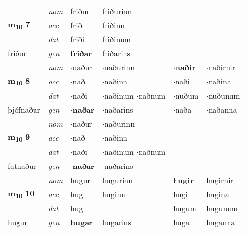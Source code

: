 \begin{longtable}[l]{llllll}
\multirow{3}{*}{{{\textbf{m{\textsubscript{10}}} \Large{\textbf{7}}}}}  & {\footnotesize{{\textit{nom}}}} & friður & friðurinn    & \textbf{} &   \\*
 &  {\footnotesize{{\textit{acc}}}} & frið  & friðinn   &   &  \\*
 &  {\footnotesize{{\textit{dat}}}} & friði & friðinum   &  &  \\*
 {\footnotesize{friður}} &   {\footnotesize{{\textit{gen}}}} & \textbf{friðar}  & friðarins  &  &  \\
\cmidrule{1-6}


\multirow{3}{*}{{{\textbf{m{\textsubscript{10}}} \Large{\textbf{8}}}}}  & {\footnotesize{{\textit{nom}}}} & $\cdot$naður & $\cdot$naðurinn    & \textbf{$\cdot$naðir} & $\cdot$naðirnir  \\*
 &  {\footnotesize{{\textit{acc}}}} & $\cdot$nað  & $\cdot$naðinn   & $\cdot$naði  & $\cdot$naðina \\*
 &  {\footnotesize{{\textit{dat}}}} & $\cdot$naði & \specialcell{$\cdot$naðinum\\  $\cdot$naðnum}   & $\cdot$nuðum & $\cdot$nuðunum \\*
 {\footnotesize{þjófnaður}} &   {\footnotesize{{\textit{gen}}}} & \textbf{$\cdot$naðar}  & $\cdot$naðarins  & $\cdot$naða & $\cdot$naðanna \\
\cmidrule{1-6}


\multirow{3}{*}{{{\textbf{m{\textsubscript{10}}} \Large{\textbf{9}}}}}  & {\footnotesize{{\textit{nom}}}} & $\cdot$naður & $\cdot$naðurinn    & \textbf{} &   \\*
 &  {\footnotesize{{\textit{acc}}}} & $\cdot$nað  & $\cdot$naðinn   &   &  \\*
 &  {\footnotesize{{\textit{dat}}}} & $\cdot$naði & \specialcell{$\cdot$naðinum\\  $\cdot$naðnum}   &  &  \\*
 {\footnotesize{fatnaður}} &   {\footnotesize{{\textit{gen}}}} & \textbf{$\cdot$naðar}  & $\cdot$naðarins  &  &  \\
\cmidrule{1-6}


\multirow{3}{*}{{{\textbf{m{\textsubscript{10}}} \Large{\textbf{10}}}}}  & {\footnotesize{{\textit{nom}}}} & hugur & hugurinn    & \textbf{hugir} & hugirnir  \\*
 &  {\footnotesize{{\textit{acc}}}} & hug  & huginn   & hugi  & hugina \\*
 &  {\footnotesize{{\textit{dat}}}} & hug &    & hugum & hugunum \\*
 {\footnotesize{hugur}} &   {\footnotesize{{\textit{gen}}}} & \textbf{hugar}  & hugarins  & huga & huganna \\
\cmidrule{1-6}



\end{longtable}
